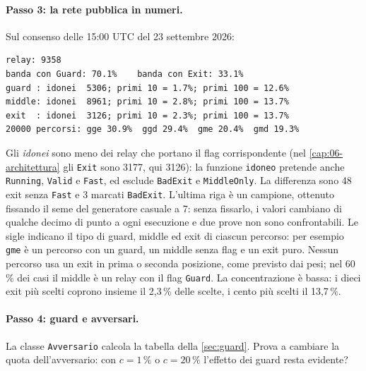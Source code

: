 \paragraph{Passo 3: la rete pubblica in numeri.} Sul consenso delle 15:00 UTC del 23 settembre 2026:
\begin{lstlisting}[numbers=none]
relay: 9358
banda con Guard: 70.1%    banda con Exit: 33.1%
guard : idonei  5306; primi 10 = 1.7%; primi 100 = 12.6%
middle: idonei  8961; primi 10 = 2.8%; primi 100 = 13.7%
exit  : idonei  3126; primi 10 = 2.3%; primi 100 = 13.7%
20000 percorsi: gge 30.9%  ggd 29.4%  gme 20.4%  gmd 19.3%
\end{lstlisting}
Gli \emph{idonei} sono meno dei relay che portano il flag corrispondente (nel \cref{cap:06-architettura} gli \texttt{Exit} sono 3177, qui 3126): la funzione \texttt{idoneo} pretende anche \texttt{Running}, \texttt{Valid} e \texttt{Fast}, ed esclude \texttt{BadExit} e \texttt{MiddleOnly}. La differenza sono 48 exit senza \texttt{Fast} e 3 marcati \texttt{BadExit}.
L'ultima riga è un campione, ottenuto fissando il seme del generatore casuale a 7: senza fissarlo, i valori cambiano di qualche decimo di punto a ogni esecuzione e due prove non sono confrontabili. Le sigle indicano il tipo di guard, middle ed exit di ciascun percorso: per esempio \texttt{gme} è un percorso con un guard, un middle senza flag e un exit puro. Nessun percorso usa un exit in prima o seconda posizione, come previsto dai pesi; nel 60\,\% dei casi il middle è un relay con il flag \texttt{Guard}. La concentrazione è bassa: i dieci exit più scelti coprono insieme il 2,3\,\% delle scelte, i cento più scelti il 13,7\,\%.

\paragraph{Passo 4: guard e avversari.} La classe \texttt{Avversario} calcola la tabella della \cref{sec:guard}. Prova a cambiare la quota dell'avversario: con $c = 1\,\%$ o $c = 20\,\%$ l'effetto dei guard resta evidente?

